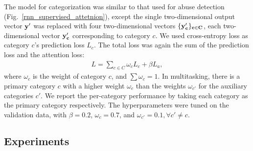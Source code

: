 \documentclass[letterpaper]{article} %
\begin{document}
\vspace{-3.32mm}
\vspace{-3.32mm}
\vspace{-3.32mm}
\vspace{-3.32mm}
The model for categorization was similar to that used for abuse detection (Fig.~\ref{rnn_supervised_attetnion}), except  the single two-dimensional output vector $\bf{y}'$ was  replaced with four two-dimensional vectors $\{\bf{y}_{c}'\}_{c\in C}$,  each two-dimensional vector $\bf{y}_{c}'$ corresponding to category $c$. We used cross-entropy loss as category $c$'s prediction loss $L_{c}$. The total loss  was again the sum of the prediction loss and the attention loss:
\begin{align}
L = \sum_{c\in C}\omega_{c}L_{c} + \beta L_{a},
\end{align}  where $\omega_{c}$ is the weight of category $c$, and $\sum\omega_{c}=1$.  In multitasking, there is a primary category $c$ with a higher weight $\omega_{c}$ than the weights $\omega_{c'}$ for the  auxiliary categories $c'$.  We report the per-category performance by taking each category as the primary category respectively.  The hyperparameters were tuned on the validation data, with $\beta=0.2$, $\omega_{c}=0.7$, and $\omega_{c'}=0.1, \forall c'\not=c$.


\vspace{-3.32mm}
\subsection{Experiments}
\end{document}
